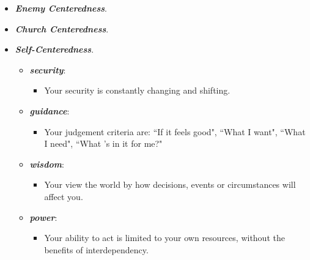\documentclass[11pt]{article}
\begin{document}
\begin{itemize}
\begin{itemize}
\item \emph{\textbf{Enemy Centeredness}}.

\item \emph{\textbf{Church Centeredness}}.

\item \emph{\textbf{Self-Centeredness}}.
\begin{itemize}
\item \emph{\textbf{security}}: 
\begin{itemize}
\item Your security is constantly changing and shifting.
\end{itemize}
  
\item \emph{\textbf{guidance}}:
\begin{itemize}
\item Your judgement criteria are: ``If it feels good", ``What I want", ``What I need", ``What 's in it for me?"
\end{itemize}
  
\item \emph{\textbf{wisdom}}:
\begin{itemize}
\item Your view the world by how decisions, events or circumstances will affect you.
\end{itemize}

\item \emph{\textbf{power}}:
\begin{itemize}
\item Your ability to act is limited to your own resources, without the benefits of interdependency.
\end{itemize}
\end{itemize}
\end{itemize}
\end{itemize}
\end{document}
